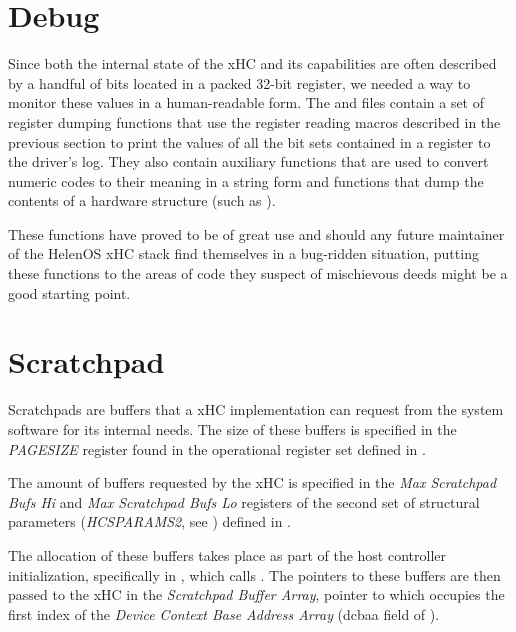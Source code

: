 \section{Debug}

Since both the internal state of the xHC and its capabilities are often described by
a handful of bits located in a packed 32-bit register, we needed a way to monitor these
values in a human-readable form. The  and
 files contain a set of register dumping
functions that use the register reading macros described in the previous section to print
the values of all the bit sets contained in a register to the driver's log. They also contain
auxiliary functions that are used to convert numeric codes to their meaning in a string form and
functions that dump the contents of a hardware structure (such as ).

These functions have proved to be of great use and should any future maintainer of the
HelenOS xHC stack find themselves in a bug-ridden situation, putting these functions to
the areas of code they suspect of mischievous deeds might be a good starting point.



\section{Scratchpad}
\label{sec:scratchpads}

Scratchpads are buffers that a xHC implementation can request from the system software
for its internal needs. The size of these buffers is specified in the \textit{PAGESIZE} register
found in the operational register set defined in .

The amount of buffers requested by the xHC is specified in the \textit{Max Scratchpad Bufs Hi} and
\textit{Max Scratchpad Bufs Lo} registers of the second set of structural parameters (\textit{HCSPARAMS2},
see ) defined in .

The allocation of these buffers takes place as part of the host controller initialization,
specifically in , which calls . The pointers
to these buffers are then passed to the xHC in the \textit{Scratchpad Buffer Array}, pointer to which
occupies the first index of the \textit{Device Context Base Address Array} (dcbaa field of
).


